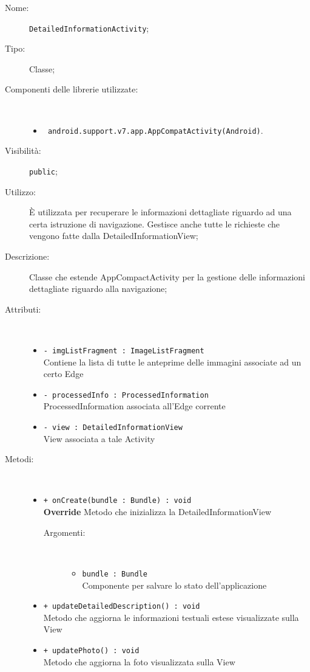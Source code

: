 \documentclass[../DefinizioneDiProdotto.tex]{subfiles}
\begin{document}
    \begin{description}
\item[Nome:] \texttt{DetailedInformationActivity};
\item[Tipo:] Classe;
\item[Componenti delle librerie utilizzate:] \
\begin{itemize}
\item \texttt{ android.support.v7.app.AppCompatActivity(Android)}.

\end{itemize}
\item[Visibilità:] \texttt{public};
\item[Utilizzo:] È utilizzata per recuperare le informazioni dettagliate riguardo ad una certa istruzione di navigazione. Gestisce anche tutte le richieste che vengono fatte dalla DetailedInformationView;
\item[Descrizione:] Classe che estende AppCompactActivity per la gestione delle informazioni dettagliate riguardo alla navigazione;
\item[Attributi:] \
\begin{itemize}
\item \texttt{- imgListFragment : ImageListFragment}\\
Contiene la lista di tutte le anteprime delle immagini associate ad un certo Edge

\item \texttt{- processedInfo : ProcessedInformation}\\
ProcessedInformation associata all'Edge corrente

\item \texttt{- view : DetailedInformationView}\\
View associata a tale Activity

\end{itemize}
\item[Metodi:] \
\begin{itemize}
\item \texttt{+ onCreate(bundle : Bundle) : void}\\
\textbf{Override} Metodo che inizializza la DetailedInformationView
 \begin{description}
\item[Argomenti:] \
\begin{itemize}
\item \texttt{bundle : Bundle}\\
Componente per salvare lo stato dell'applicazione\end{itemize}
\end{description}
\item \texttt{+ updateDetailedDescription() : void}\\
Metodo che aggiorna le informazioni testuali estese visualizzate sulla View
 \item \texttt{+ updatePhoto() : void}\\
Metodo che aggiorna la foto visualizzata sulla View
 \end{itemize}
\end{description}
\end{document}
